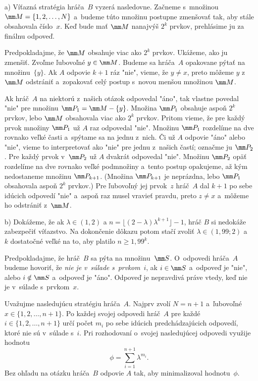 {%
a) 
Víťazná stratégia hráča~$B$ vyzerá nasledovne. Začneme s~množinou $\mm M=\{1,2,\dots,N\}$ a~budeme túto množinu postupne zmenšovať tak, aby stále obsahovala číslo~$x$.
Keď bude mať $\mm M$ nanajvýš $2^k$ prvkov, prehlásime ju za finálnu odpoveď.

Predpokladajme, že $\mm M$ obsahuje viac ako $2^k$ prvkov. Ukážeme, ako ju zmenšiť. Zvoľme ľubovoľné $y\in\mm M$. Budeme sa hráča~$A$ opakovane pýtať na množinu~$\{y\}$. Ak $A$ odpovie $k+1$ ráz "nie", vieme, že $y\ne x$, preto môžeme $y$ z~$\mm M$ odstrániť a~zopakovať celý postup s~novou menšou množinou $\mm M$.

Ak hráč~$A$ na niektorú z~našich otázok odpovedal "áno", tak vlastne povedal "nie" pre množinu $\mm P_1 = \mm M-\{y\}$. Množina $\mm P_1$ obsahuje aspoň $2^k$ prvkov, lebo $\mm M$ obsahovala viac ako $2^k$ prvkov. Pritom vieme, že pre každý prvok množiny $\mm P_1$ už $A$ raz odpovedal "nie". Množinu $\mm P_1$ rozdelíme na dve rovnako veľké časti a~spýtame sa na jednu z~nich. Či už $A$ odpovie "áno" alebo "nie", vieme to interpretovať ako "nie" pre jednu z~našich častí; označme ju $\mm P_2$. Pre každý prvok v~$\mm P_2$ už $A$ dvakrát odpovedal "nie". Množinu $\mm P_2$ opäť rozdelíme na dve rovnako veľké podmnožiny a~tento postup opakujeme, až kým nedostaneme množinu $\mm P_{k+1}$. (Množina $\mm P_{k+1}$ je neprázdna, lebo $\mm P_1$ obsahovala aspoň $2^k$ prvkov.) Pre ľubovoľný jej prvok~$z$ hráč~$A$ dal $k+1$ po sebe idúcich odpovedí "nie" a~aspoň raz musel vravieť pravdu, preto $z\ne x$ a~môžeme ho odstrániť z~$\mm M$.

\smallskip
b) Dokážeme, že ak $\lambda\in(1,2)$ a $n = \lfloor(2-\lambda)\lambda^{k+1}\rfloor -1$, hráč $B$ si nedokáže zabezpečiť víťazstvo.
Na dokončenie dôkazu potom stačí zvoliť $\lambda\in(1{,}99; 2)$ a~$k$ dostatočné veľké na to, aby platilo $n\ge 1{,}99^k$.

Predpokladajme, že hráč~$B$ sa pýta na množinu~$\mm S$. O~odpovedi hráča~$A$ budeme hovoriť, že {\it nie je v~súlade s~prvkom~$i$}, ak $i\in\mm S$ a~odpoveď je "nie", alebo $i\notin\mm S$ a~odpoveď je "áno". Odpoveď je nepravdivá práve vtedy, keď nie je v~súlade s~prvkom~$x$.

Uvažujme nasledujúcu stratégiu hráča~$A$. Najprv zvolí $N = n+1$ a~ľubovoľné $x\in \{1, 2, \dots, n+1\}$.
Po každej svojej odpovedi hráč~$A$ pre každé $i\in\{1,2,\dots,n+1\}$ určí počet $m_i$ po sebe idúcich predchádzajúcich odpovedí, ktoré nie sú v~súlade s~$i$.
Pri rozhodovaní o~svojej nasledujúcej odpovedi využije hodnotu
$$
\phi = \sum_{i=1}^{n+1} \lambda^{m_i}.
$$
Bez ohľadu na otázku hráča~$B$ odpovie $A$ tak, aby minimalizoval hodnotu~$\phi$.

}
